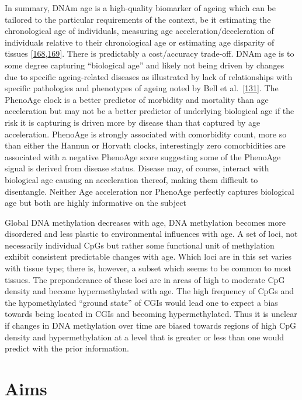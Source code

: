 \documentclass[
]{book}
\begin{document}
In summary, DNAm age is a high-quality biomarker of ageing which can be tailored to the particular requirements of the context, be it estimating the chronological age of individuals, measuring age acceleration/deceleration of individuals relative to their chronological age or estimating age disparity of tissues {[}\protect\hyperlink{ref-Horvath2018}{168},\protect\hyperlink{ref-Bell2019}{169}{]}.
There is predictably a cost/accuracy trade-off.
DNAm age is to some degree capturing ``biological age'' and likely not being driven by changes due to specific ageing-related diseases as illustrated by lack of relationships with specific pathologies and phenotypes of ageing noted by Bell et al.~{[}\protect\hyperlink{ref-Bell2012}{131}{]}.
The PhenoAge clock is a better predictor of morbidity and mortality than age acceleration but may not be a better predictor of underlying biological age if the risk it is capturing is driven more by disease than that captured by age acceleration.
PhenoAge is strongly associated with comorbidity count, more so than either the Hannun or Horvath clocks, interestingly zero comorbidities are associated with a negative PhenoAge score suggesting some of the PhenoAge signal is derived from disease status.
Disease may, of course, interact with biological age causing an acceleration thereof, making them difficult to disentangle.
Neither Age acceleration nor PhenoAge perfectly captures biological age but both are highly informative on the subject

Global DNA methylation decreases with age, DNA methylation becomes more disordered and less plastic to environmental influences with age.
A set of loci, not necessarily individual CpGs but rather some functional unit of methylation exhibit consistent predictable changes with age.
Which loci are in this set varies with tissue type; there is, however, a subset which seems to be common to most tissues.
The preponderance of these loci are in areas of high to moderate CpG density and become hypermethylated with age.
The high frequency of CpGs and the hypomethylated ``ground state'' of CGIs would lead one to expect a bias towards being located in CGIs and becoming hypermethylated.
Thus it is unclear if changes in DNA methylation over time are biased towards regions of high CpG density and hypermethylation at a level that is greater or less than one would predict with the prior information.

\hypertarget{aims}{%
\section{Aims}\label{aims}}
\end{document}
